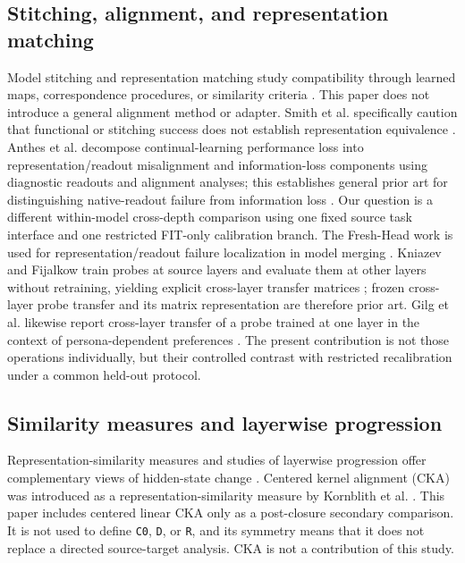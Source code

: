 \documentclass{article}
\begin{document}
\subsection{Stitching, alignment, and representation matching}
Model stitching and representation matching study compatibility through learned maps, correspondence procedures, or similarity criteria \citep{bansal2021revisiting,csiszarik2021similarity,maiorca2023latent}. This paper does not introduce a general alignment method or adapter. Smith et al. specifically caution that functional or stitching success does not establish representation equivalence \citep{smith2025functional}. Anthes et al. decompose continual-learning performance loss into representation/readout misalignment and information-loss components using diagnostic readouts and alignment analyses; this establishes general prior art for distinguishing native-readout failure from information loss \citep{anthes2023diagnosing}. Our question is a different within-model cross-depth comparison using one fixed source task interface and one restricted FIT-only calibration branch. The Fresh-Head work is used for representation/readout failure localization in model merging \citep{freshhead2025localising}. Kniazev and Fijalkow train probes at source layers and evaluate them at other layers without retraining, yielding explicit cross-layer transfer matrices \citep{kniazev2026structured}; frozen cross-layer probe transfer and its matrix representation are therefore prior art. Gilg et al. likewise report cross-layer transfer of a probe trained at one layer in the context of persona-dependent preferences \citep{gilg2026probing}. The present contribution is not those operations individually, but their controlled contrast with restricted recalibration under a common held-out protocol.

\subsection{Similarity measures and layerwise progression}
Representation-similarity measures and studies of layerwise progression offer complementary views of hidden-state change \citep{csiszarik2021similarity,jiang2024tracing}. Centered kernel alignment (CKA) was introduced as a representation-similarity measure by Kornblith et al. \citep{kornblith2019similarity}. This paper includes centered linear CKA only as a post-closure secondary comparison. It is not used to define \texttt{C0}, \texttt{D}, or \texttt{R}, and its symmetry means that it does not replace a directed source-target analysis. CKA is not a contribution of this study.
\end{document}
